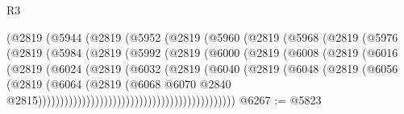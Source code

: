 \begin{lexlean}{R3}
\begin{coremodule}
                          (@2819
                            (@5944
                              (@2819
                                (@5952
                                  (@2819
                                    (@5960
                                      (@2819
                                        (@5968
                                          (@2819
                                            (@5976
                                              (@2819
                                                (@5984
                                                  (@2819
                                                    (@5992
                                                      (@2819
                                                        (@6000
                                                          (@2819
                                                            (@6008
                                                              (@2819
                                                                (@6016
                                                                  (@2819
                                                                    (@6024
                                                                      (@2819
                                                                        (@6032
                                                                          (@2819
                                                                            (@6040
                                                                              (@2819
                                                                                (@6048
                                                                                  (@2819
                                                                                    (@6056
                                                                                      (@2819
                                                                                        (@6064
                                                                                          (@2819
                                                                                            (@6068
                                                                                              @6070
                                                                                              @2840
                                                                                              @2815)))))))))))))))))))))))))))))))))))))))))))))
@6267 := @5823

\end{coremodule}
\end{lexlean}

